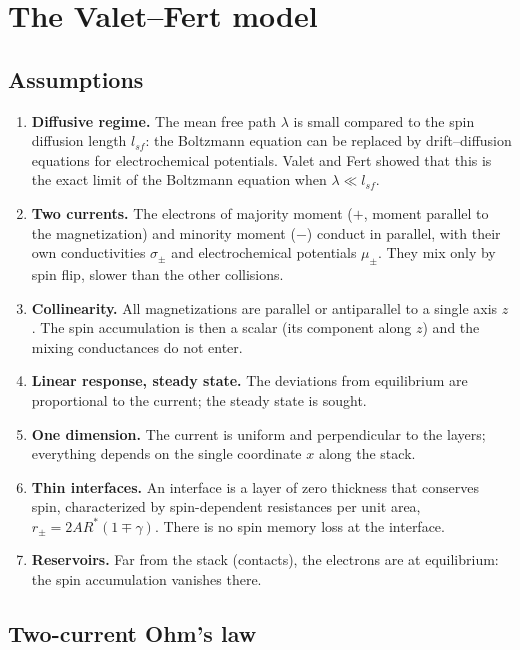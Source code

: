 \documentclass[11pt,a4paper]{article}
\begin{document}
\section{The Valet--Fert model}

\subsection{Assumptions}

\begin{enumerate}
  \item \textbf{Diffusive regime.} The mean free path $\lambda$ is small
    compared to the spin diffusion length $l_{sf}$: the Boltzmann equation
    can be replaced by drift--diffusion equations for electrochemical
    potentials. Valet and Fert showed that this is the exact limit of the
    Boltzmann equation when $\lambda\ll l_{sf}$.
  \item \textbf{Two currents.} The electrons of majority moment ($+$,
    moment parallel to the magnetization) and minority moment ($-$)
    conduct in parallel, with their own conductivities $\sigma_\pm$ and
    electrochemical potentials $\mu_\pm$. They mix only by spin flip,
    slower than the other collisions.
  \item \textbf{Collinearity.} All magnetizations are parallel or
    antiparallel to a single axis $z$. The spin accumulation is then a
    scalar (its component along $z$) and the mixing conductances do not
    enter.
  \item \textbf{Linear response, steady state.} The deviations from
    equilibrium are proportional to the current; the steady state is
    sought.
  \item \textbf{One dimension.} The current is uniform and perpendicular to
    the layers; everything depends on the single coordinate $x$ along the
    stack.
  \item \textbf{Thin interfaces.} An interface is a layer of zero thickness
    that conserves spin, characterized by spin-dependent resistances per
    unit area, $r_\pm = 2AR^*(1\mp\gamma)$. There is no spin memory loss
    at the interface.
  \item \textbf{Reservoirs.} Far from the stack (contacts), the electrons
    are at equilibrium: the spin accumulation vanishes there.
\end{enumerate}

\subsection{Two-current Ohm's law}
\end{document}
